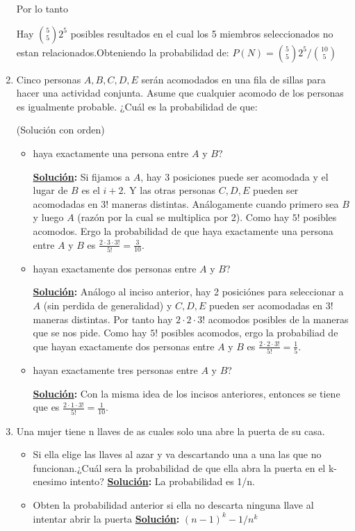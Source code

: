 \documentclass[11pt,letterpaper]{report}
\newcommand{\sol}{\textbf{\underline{Solución}: }} %
\begin{document}
\begin{enumerate}
Por lo tanto

Hay $\binom{5}{5}2^5$ posibles resultados en el cual los 5 miembros seleccionados no estan relacionados.Obteniendo la probabilidad de:
$P(N) = \binom{5}{5}2^5/\binom{10}{5}$


\item Cinco personas $A,B,C,D,E$ serán acomodados en una fila de sillas para hacer una actividad 
conjunta. Asume que cualquier acomodo de los personas es igualmente probable. ¿Cuál es la
probabilidad de que:

(Solución con orden)

\begin{itemize}
    \item haya exactamente una persona entre $A$ y $B$?
    
    \sol Si fijamos a $A$, hay 3 posiciones puede ser acomodada y el lugar de $B$ es el $i+2$. Y las
    otras personas $C,D,E$ pueden ser acomodadas en $3!$ maneras distintas. Análogamente cuando
    primero sea $B$ y luego $A$ (razón por la cual se multiplica por 2). Como hay $5!$ posibles
    acomodos. Ergo la probabilidad de que haya exactamente una persona entre $A$ y $B$
    es $\frac{2 \cdot 3 \cdot 3!}{5!} = \frac{3}{10}$.

    \item hayan exactamente dos personas entre $A$ y $B$?
    
    \sol Análogo al inciso anterior, hay 2 posiciónes para seleccionar a $A$ (sin perdida de
    generalidad) y $C,D,E$ pueden ser acomodadas en $3!$ maneras distintas. Por tanto hay 
    $2 \cdot 2 \cdot 3!$ acomodos posibles de la maneras que se nos pide. Como hay $5!$ posibles
    acomodos, ergo la probabiliad de que hayan exactamente dos personas entre $A$ y $B$ es
    $\frac{2 \cdot 2 \cdot 3!}{5!}=\frac{1}{5}$.

    \item hayan exactamente tres personas entre $A$ y $B$?
    
    \sol Con la misma idea de los incisos anteriores, entonces se tiene que es
    $\frac{2 \cdot 1 \cdot 3!}{5!}=\frac{1}{10}$.
\end{itemize}

\item Una mujer tiene n llaves de as cuales solo una abre la puerta de su casa.
\begin{itemize}
\item Si ella elige las llaves al azar y va descartando una a una las que no funcionan.¿Cuál sera la probabilidad de que ella abra la puerta en el k-enesimo intento?
\sol
La probabilidad es 1/n.
\item Obten la probabilidad anterior si ella no descarta ninguna llave al intentar abrir la puerta
\sol
$(n-1)^k-1/n^k$
\end{itemize}


\end{enumerate}
\end{document}
